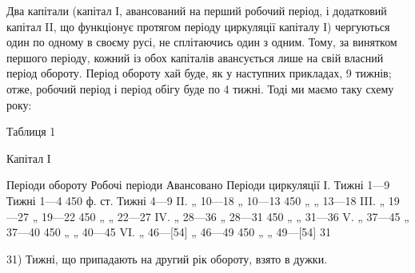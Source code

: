 Два капітали (капітал І, авансований на перший робочий період, і додатковий
капітал II, що функціонує протягом періоду циркуляції капіталу І)
чергуються один по одному в своєму русі, не сплітаючись один з одним.
Тому, за винятком першого періоду, кожний із обох капіталів авансується
лише на свій власний період обороту. Період обороту хай буде,
як у наступних прикладах, 9 тижнів; отже, робочий період і період обігу
буде по 4 тижні. Тоді ми маємо таку схему року:

Таблиця 1

Капітал І

Періоди обороту    Робочі періоди    Авансовано    Періоди циркуляції
І. Тижні 1—9    Тижні 1—4                 450 ф. ст.        Тижні 4—9
II.    „   10—18        „      10—13             450 „ „                  13—18
III.   „   19—27       „       19—22             450 „ „                22—27
IV.   „    28—36      „        28—31             450 „ „               31—36
V.     „    37—45      „        37—40             450 „ „               40—45
VI.   „    46—[54]  „        46—49            450 „ „            49—[54] 31

31) Тижні, що припадають на другий рік обороту, взято в дужки.

